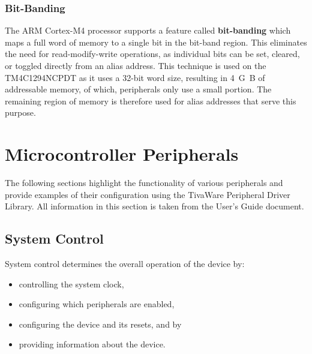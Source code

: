 \documentclass{article}
\begin{document}
\subsubsection{Bit-Banding}
The ARM Cortex-M4 processor supports a feature called
\textbf{bit-banding} which maps a full word of memory to a single bit
in the bit-band region. This eliminates the need for read-modify-write
operations, as individual bits can be set, cleared, or toggled directly
from an alias address. This technique is used on the TM4C1294NCPDT as
it uses a 32-bit word size, resulting in \qty{4}{G.B} of addressable
memory, of which, peripherals only use a small portion. The remaining
region of memory is therefore used for alias addresses that serve this
purpose.
\section{Microcontroller Peripherals}
The following sections highlight the functionality of various
peripherals and provide examples of their configuration using the
TivaWare Peripheral Driver Library. All information in this section is
taken from the User's Guide document.
\subsection{System Control}
System control determines the overall operation of the device by:
\begin{itemize}
    \item controlling the system clock,
    \item configuring which peripherals are enabled,
    \item configuring the device and its resets, and by
    \item providing information about the device.
\end{itemize}
\end{document}
